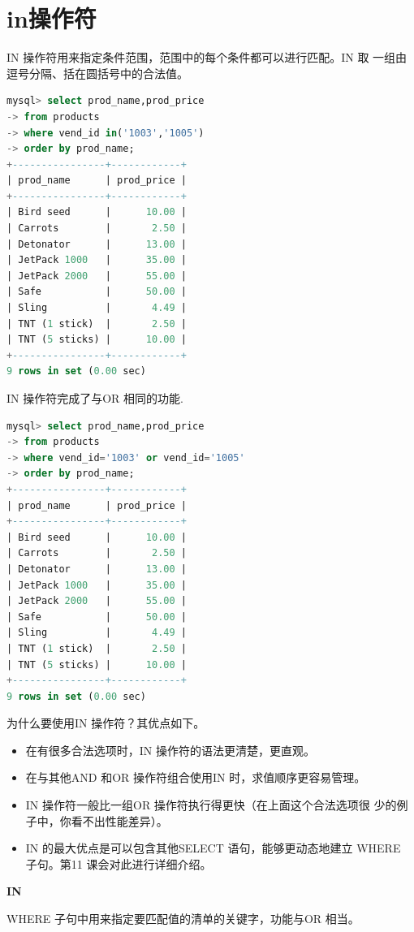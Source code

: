 \documentclass[11pt,a4paper,oneside]{book}
\begin{document}
\section{in操作符}
IN 操作符用来指定条件范围，范围中的每个条件都可以进行匹配。IN 取
一组由逗号分隔、括在圆括号中的合法值。
\begin{lstlisting}[language=sql]
mysql> select prod_name,prod_price
-> from products
-> where vend_id in('1003','1005')
-> order by prod_name;
+----------------+------------+
| prod_name      | prod_price |
+----------------+------------+
| Bird seed      |      10.00 |
| Carrots        |       2.50 |
| Detonator      |      13.00 |
| JetPack 1000   |      35.00 |
| JetPack 2000   |      55.00 |
| Safe           |      50.00 |
| Sling          |       4.49 |
| TNT (1 stick)  |       2.50 |
| TNT (5 sticks) |      10.00 |
+----------------+------------+
9 rows in set (0.00 sec)
\end{lstlisting}
IN 操作符完成了与OR 相同的功能.
\begin{lstlisting}[language=sql]
mysql> select prod_name,prod_price
-> from products
-> where vend_id='1003' or vend_id='1005'
-> order by prod_name;
+----------------+------------+
| prod_name      | prod_price |
+----------------+------------+
| Bird seed      |      10.00 |
| Carrots        |       2.50 |
| Detonator      |      13.00 |
| JetPack 1000   |      35.00 |
| JetPack 2000   |      55.00 |
| Safe           |      50.00 |
| Sling          |       4.49 |
| TNT (1 stick)  |       2.50 |
| TNT (5 sticks) |      10.00 |
+----------------+------------+
9 rows in set (0.00 sec)
\end{lstlisting}

为什么要使用IN 操作符？其优点如下。
\begin{itemize}
	\item 在有很多合法选项时，IN 操作符的语法更清楚，更直观。
	\item 在与其他AND 和OR 操作符组合使用IN 时，求值顺序更容易管理。
	\item IN 操作符一般比一组OR 操作符执行得更快（在上面这个合法选项很
	少的例子中，你看不出性能差异）。
	\item IN 的最大优点是可以包含其他SELECT 语句，能够更动态地建立
	WHERE 子句。第11 课会对此进行详细介绍。
\end{itemize}
\begin{tcolorbox}[colback=blue!7!white,colframe=blue!40]
	\textbf{IN}
	
	WHERE 子句中用来指定要匹配值的清单的关键字，功能与OR 相当。
\end{tcolorbox}
\end{document}
